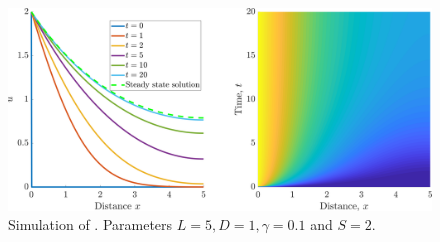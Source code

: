\begin{figure}[!!!h!!!tb]
\centering
\includegraphics[width=\tp]{../Pictures/French_flag_sims.png}
\caption{Simulation of . Parameters $L=5, D=1 ,\gamma=0.1$ and $S=2$.\label{French flag sims}}
\end{figure}



